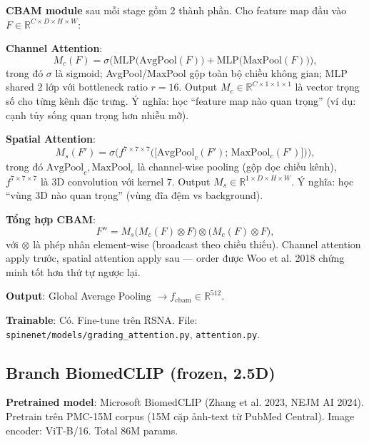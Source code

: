 \documentclass[11pt,a4paper]{article}
\begin{document}
\noindent\textbf{CBAM module} sau mỗi stage gồm 2 thành phần.
Cho feature map đầu vào
$F \in \mathbb{R}^{C \times D \times H \times W}$:

\textbf{Channel Attention}:
\begin{equation}
M_c(F) = \sigma\!\Big(\text{MLP}\big(\text{AvgPool}(F)\big)
                    + \text{MLP}\big(\text{MaxPool}(F)\big)\Big),
\label{eq:cbam_channel_vi}
\end{equation}
trong đó $\sigma$ là sigmoid; AvgPool/MaxPool gộp toàn bộ chiều không
gian; MLP shared 2 lớp với bottleneck ratio $r = 16$. Output
$M_c \in \mathbb{R}^{C \times 1 \times 1 \times 1}$ là vector trọng số
cho từng kênh đặc trưng. Ý nghĩa: học ``feature map nào quan trọng''
(ví dụ: cạnh tủy sống quan trọng hơn nhiễu mỡ).

\textbf{Spatial Attention}:
\begin{equation}
M_s(F') = \sigma\!\Big(f^{7 \times 7 \times 7}\!
                      \big(\big[\text{AvgPool}_c(F');\,
                                \text{MaxPool}_c(F')\big]\big)\Big),
\label{eq:cbam_spatial_vi}
\end{equation}
trong đó $\text{AvgPool}_c, \text{MaxPool}_c$ là channel-wise pooling
(gộp dọc chiều kênh), $f^{7\times7\times7}$ là 3D convolution với
kernel $7$. Output $M_s \in \mathbb{R}^{1 \times D \times H \times W}$.
Ý nghĩa: học ``vùng 3D nào quan trọng'' (vùng đĩa đệm vs background).

\textbf{Tổng hợp CBAM}:
\begin{equation}
F'' = M_s\!\big(M_c(F) \otimes F\big)
      \otimes \big(M_c(F) \otimes F\big),
\label{eq:cbam_total_vi}
\end{equation}
với $\otimes$ là phép nhân element-wise (broadcast theo chiều thiếu).
Channel attention apply trước, spatial attention apply sau --- order
được Woo et al. 2018 chứng minh tốt hơn thứ tự ngược lại.

\noindent\textbf{Output}: Global Average Pooling $\to f_{\text{cbam}}
\in \mathbb{R}^{512}$.

\noindent\textbf{Trainable}: Có. Fine-tune trên RSNA. File:
\verb|spinenet/models/grading_attention.py|, \verb|attention.py|.

\subsection{Branch BiomedCLIP (frozen, 2.5D)}

\noindent\textbf{Pretrained model}: Microsoft BiomedCLIP
(Zhang et al. 2023, NEJM AI 2024). Pretrain trên PMC-15M corpus
(15M cặp ảnh-text từ PubMed Central). Image encoder: ViT-B/16. Total
86M params.
\end{document}
